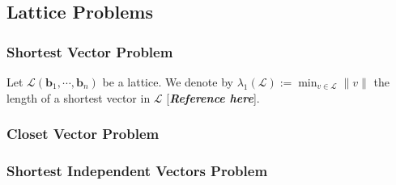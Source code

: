 \documentclass[11pt,a4paper]{article}
\begin{document}
\subsection{Lattice Problems}
\subsubsection{Shortest Vector Problem}
\par Let $\mathcal{L}(\mathbf{b}_{1}, \cdots, \mathbf{b}_{n})$ be a lattice. We denote by $\lambda_{1}(\mathcal{L}):=\min_{v\in \mathcal{L}}\|v\|$ the length of a shortest vector in $\mathcal{L}$ [\textit{\textbf{Reference here}}].

\subsubsection{Closet Vector Problem}

\subsubsection{Shortest Independent Vectors Problem}
\end{document}
